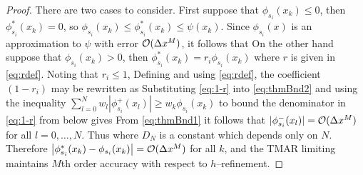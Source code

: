 \documentclass{ametsoc}
\begin{document}
\begin{proof}
There are two cases to consider. First suppose that $\phi_{s_i}(x_k) \leq 0$, then $\phi_{s_i}^*(x_k) = 0$, so $\phi_{s_i}(x_k) \leq \phi^*_{s_i}(x_k) \leq \psi(x_k)$. Since $\phi_{s_i}(x)$ is an approximation to $\psi$ with error $\mathcal{O}(\Delta x^{M})$, it follows that
On the other hand suppose that $\phi_{s_i}(x_k) > 0$, then $\phi_{s_i}^*(x_k) = r_i \phi_{s_i}(x_k)$ where $r$ is given in \eqref{eq:rdef}. Noting that $r_i \leq 1$,
Defining 
and using \eqref{eq:rdef}, the coefficient $(1-r_i)$ may be rewritten as
Substituting \eqref{eq:1-r} into \eqref{eq:thmBnd2} and using the inequality $\sum\limits_{l=0}^N w_l \left| \phi_{s_i}^+(x_l) \right| \geq w_k \phi_{s_i}(x_k)$ to bound the denominator in \eqref{eq:1-r} from below gives
From \eqref{eq:thmBnd1} it follows that $|\phi_{s_i}^{-}(x_l)| = \mathcal{O}(\Delta x^{M})$ for all $l=0,\dots,N$. Thus
where $D_N$ is a constant which depends only on $N$. Therefore $\left| \phi^*_{s_i}(x_k) - \phi_{s_i}(x_k) \right| = \mathcal{O}(\Delta x^{M})$ for all $k$, and  the TMAR limiting maintains $M$th order accuracy with respect to $h$--refinement.
\end{proof}

\end{document}

